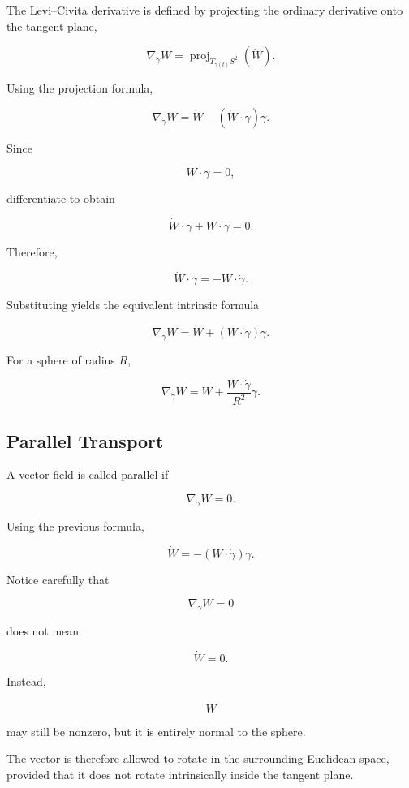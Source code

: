 \documentclass[12pt,a4paper]{article}
\theoremstyle{notespace}
\begin{document}
The Levi--Civita derivative is defined by projecting the ordinary derivative
onto the tangent plane,

\[
\boxed{
	\nabla_{\dot\gamma}W
	=
	\operatorname{proj}_{T_{\gamma(t)}S^2}
	(\dot W).
}
\]

Using the projection formula,

\[
\boxed{
	\nabla_{\dot\gamma}W
	=
	\dot W
	-
	(\dot W\cdot\gamma)\gamma.
}
\]

Since

\[
W\cdot\gamma=0,
\]

differentiate to obtain

\[
\dot W\cdot\gamma
+
W\cdot\dot\gamma
=
0.
\]

Therefore,

\[
\dot W\cdot\gamma
=
-
W\cdot\dot\gamma.
\]

Substituting yields the equivalent intrinsic formula

\[
\boxed{
	\nabla_{\dot\gamma}W
	=
	\dot W
	+
	(W\cdot\dot\gamma)\gamma.
}
\]

For a sphere of radius $R$,

\[
\boxed{
	\nabla_{\dot\gamma}W
	=
	\dot W
	+
	\frac{W\cdot\dot\gamma}{R^2}\gamma.
}
\]

\subsection{Parallel Transport}

A vector field is called parallel if

\[
\boxed{
	\nabla_{\dot\gamma}W=0.
}
\]

Using the previous formula,

\[
\boxed{
	\dot W
	=
	-
	(W\cdot\dot\gamma)\gamma.
}
\]

Notice carefully that

\[
\nabla_{\dot\gamma}W=0
\]

does not mean

\[
\dot W=0.
\]

Instead,

\[
\dot W
\]

may still be nonzero, but it is entirely normal to the sphere.

The vector is therefore allowed to rotate in the surrounding Euclidean space,
provided that it does not rotate intrinsically inside the tangent plane.

\end{document}
